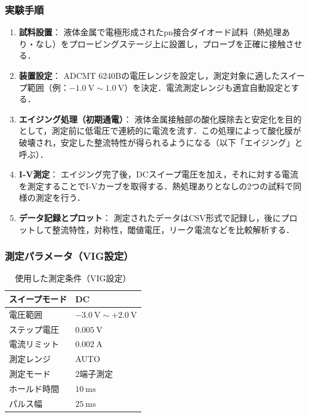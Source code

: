 \subsubsection*{実験手順}

\begin{enumerate}
    \item \textbf{試料設置}：  
    液体金属で電極形成されたpn接合ダイオード試料（熱処理あり・なし）をプロービングステージ上に設置し，プローブを正確に接触させる．

    \item \textbf{装置設定}：  
    ADCMT 6240Bの電圧レンジを設定し，測定対象に適したスイープ範囲（例：\(-1.0~\mathrm{V} \sim 1.0~\mathrm{V}\)）を決定．電流測定レンジも適宜自動設定とする．

    \item \textbf{エイジング処理（初期通電）}：  
    液体金属接触部の酸化膜除去と安定化を目的として，測定前に低電圧で連続的に電流を流す．この処理によって酸化膜が破壊され，安定した整流特性が得られるようになる（以下「エイジング」と呼ぶ）．

    \item \textbf{I-V測定}：  
    エイジング完了後，DCスイープ電圧を加え，それに対する電流を測定することでI-Vカーブを取得する．熱処理ありとなしの2つの試料で同様の測定を行う．

    \item \textbf{データ記録とプロット}：  
    測定されたデータはCSV形式で記録し，後にプロットして整流特性，対称性，閾値電圧，リーク電流などを比較解析する．
\end{enumerate}

\subsubsection*{測定パラメータ（VIG設定）}
\begin{table}[H]
\centering
\begin{tabular}{|l|l|}
\hline
スイープモード & DC \\ \hline
電圧範囲 & $-3.0 \ \mathrm{V} \sim +2.0 \ \mathrm{V}$ \\ \hline
ステップ電圧 & $0.005 \ \mathrm{V}$ \\ \hline
電流リミット & $0.002 \ \mathrm{A}$ \\ \hline
測定レンジ & AUTO \\ \hline
測定モード & 2端子測定 \\ \hline
ホールド時間 & $10 \ \mathrm{ms}$ \\ \hline
パルス幅 & $25 \ \mathrm{ms}$ \\ \hline
\end{tabular}
\caption{使用した測定条件（VIG設定）}
\end{table}

